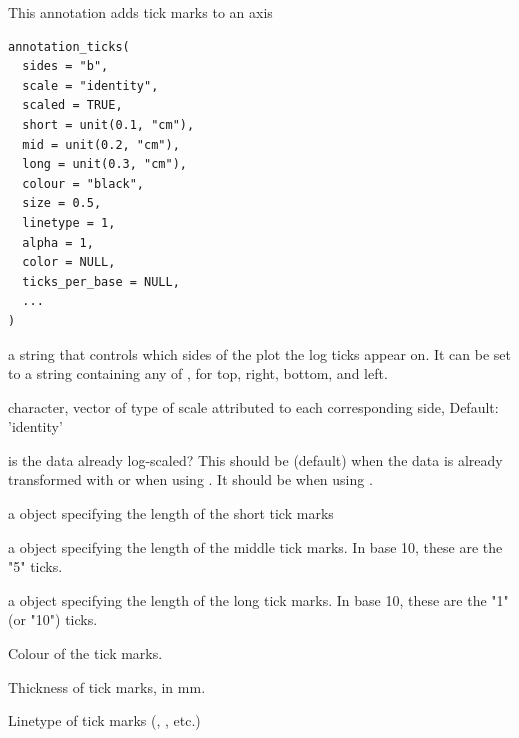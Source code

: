 \documentclass[a4paper]{book}
\begin{document}
%
\begin{Description}
This annotation adds tick marks to an axis
\end{Description}
%
\begin{Usage}
\begin{verbatim}
annotation_ticks(
  sides = "b",
  scale = "identity",
  scaled = TRUE,
  short = unit(0.1, "cm"),
  mid = unit(0.2, "cm"),
  long = unit(0.3, "cm"),
  colour = "black",
  size = 0.5,
  linetype = 1,
  alpha = 1,
  color = NULL,
  ticks_per_base = NULL,
  ...
)
\end{verbatim}
\end{Usage}
%
\begin{Arguments}
\begin{ldescription}
\item[\code{sides}] a string that controls which sides of the plot the log ticks appear on.
It can be set to a string containing any of , for top, right,
bottom, and left.

\item[\code{scale}] character, vector of type of scale attributed to each corresponding side, Default: 'identity'

\item[\code{scaled}] is the data already log-scaled? This should be 
(default) when the data is already transformed with  or when
using . It should be  when using
.

\item[\code{short}] a  object specifying the length of the
short tick marks

\item[\code{mid}] a  object specifying the length of the
middle tick marks. In base 10, these are the "5" ticks.

\item[\code{long}] a  object specifying the length of the
long tick marks. In base 10, these are the "1" (or "10") ticks.

\item[\code{colour}] Colour of the tick marks.

\item[\code{size}] Thickness of tick marks, in mm.

\item[\code{linetype}] Linetype of tick marks (, , etc.)


\end{ldescription}
\end{Arguments}
\end{document}
